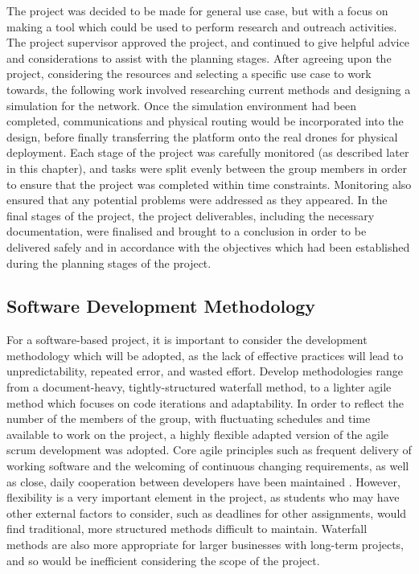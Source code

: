 The project was decided to be made for general use case, but with a focus on making a tool which could be used to perform research and outreach activities. The project supervisor approved the project, and continued to give helpful advice and considerations to assist with the planning stages. After agreeing upon the project, considering the resources and selecting a specific use case to work towards, the following work involved researching current methods and designing a simulation for the network. Once the simulation environment had been completed, communications and physical routing would be incorporated into the design, before finally transferring the platform onto the real drones for physical deployment. Each stage of the project was carefully monitored (as described later in this chapter), and tasks were split evenly between the group members in order to ensure that the project was completed within time constraints. Monitoring also ensured that any potential problems were addressed as they appeared. In the final stages of the project, the project deliverables, including the necessary documentation, were finalised and brought to a conclusion in order to be delivered safely and in accordance with the objectives which had been established during the planning stages of the project.

\subsection{Software Development Methodology}
For a software-based project, it is important to consider the development methodology which will be adopted, as the lack of effective practices will lead to unpredictability, repeated error, and wasted effort. Develop methodologies range from a document-heavy, tightly-structured waterfall method, to a lighter agile method which focuses on code iterations and adaptability. In order to reflect the number of the members of the group, with fluctuating schedules and time available to work on the project, a highly flexible adapted version of the agile scrum development was adopted. Core agile principles such as frequent delivery of working software and the welcoming of continuous changing requirements, as well as close, daily cooperation between developers have been maintained \cite{robertmartin2003}. However, flexibility is a very important element in the project, as students who may have other external factors to consider, such as deadlines for other assignments, would find traditional, more structured methods difficult to maintain. Waterfall methods are also more appropriate for larger businesses with long-term projects, and so would be inefficient considering the scope of the project.

